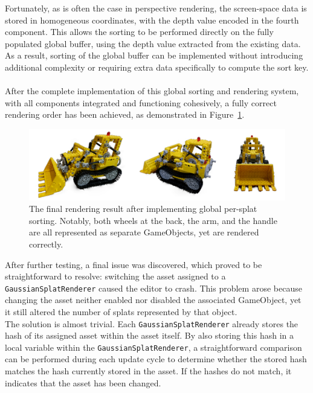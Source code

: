 \documentclass[12pt]{article}
\begin{document}
Fortunately, as is often the case in perspective rendering, the screen-space data is stored in homogeneous coordinates, with the depth value encoded in the fourth component. This allows the sorting to be performed directly on the fully populated global buffer, using the depth value extracted from the existing data. As a result, sorting of the global buffer can be implemented without introducing additional complexity or requiring extra data specifically to compute the sort key.\\\\
After the complete implementation of this global sorting and rendering system, with all components integrated and functioning cohesively, a fully correct rendering order has been achieved, as demonstrated in Figure~\ref{fig:finalrender}.
\begin{figure}[h!]
	\centering
	\includegraphics[width=\textwidth]{Images/finalrender.png}
	\caption{The final rendering result after implementing global per-splat sorting. Notably, both wheels at the back, the arm, and the handle are all represented as separate GameObjects, yet are rendered correctly.}
	\label{fig:finalrender}
\end{figure}
\FloatBarrier
\noindent
After further testing, a final issue was discovered, which proved to be straightforward to resolve: switching the asset assigned to a 
\linebreak 
\texttt{GaussianSplatRenderer} caused the editor to crash. This problem arose because changing the asset neither enabled nor disabled the associated GameObject, yet it still altered the number of splats represented by that object.
\\
The solution is almost trivial. Each \texttt{GaussianSplatRenderer} already stores the hash of its assigned asset within the asset itself. By also storing this hash in a local variable within the \texttt{GaussianSplatRenderer}, a straightforward comparison can be performed during each update cycle to determine whether the stored hash matches the hash currently stored in the asset. If the hashes do not match, it indicates that the asset has been changed.
\\
\end{document}
